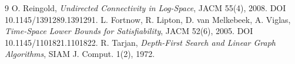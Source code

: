 \documentclass[11pt]{article}
\begin{document}
\begin{thebibliography}{9}
 O. Reingold, \emph{Undirected Connectivity in Log-Space}, JACM 55(4), 2008. DOI 10.1145/1391289.1391291.
 L. Fortnow, R. Lipton, D. van Melkebeek, A. Viglas, \emph{Time-Space Lower Bounds for Satisfiability}, JACM 52(6), 2005. DOI 10.1145/1101821.1101822.
 R. Tarjan, \emph{Depth-First Search and Linear Graph Algorithms}, SIAM J. Comput. 1(2), 1972.
\end{thebibliography}
\end{document}

